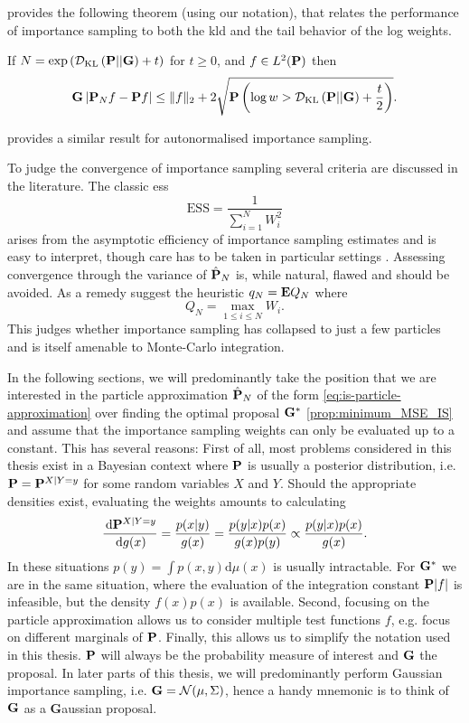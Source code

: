 \cite{Chatterjee2018Sample} provides the following theorem (using our notation), that relates the performance of importance sampling to both the \gls{kld} and the tail behavior of the log weights.
\begin{theorem}
    \label{thm:chatterje2018Thm1}
    If $N = \exp \left( \Dkl{\P}{\G} + t \right)$ for $ t\geq 0$, and $f \in L^{2}(\P)$ then
    $$
        \G \left\lvert \P_{N} f - \P f \right\rvert \leq \lVert f \rVert_{2} + 2 \sqrt{ \P \left( \log w > \Dkl{\P}{\G} + \frac{t}{2} \right)}.
    $$
\end{theorem}
\citep[Theorem 1.2]{Chatterjee2018Sample} provides a similar result for autonormalised importance sampling.

To judge the convergence of importance sampling several criteria are discussed in the literature. The classic \gls{ess}\cite{Kong1994Sequential} 
$$
\text{ESS} = \frac{1}{\sum_{i = 1}^N W^{2}_{i}}
$$
arises from the asymptotic efficiency of importance sampling estimates and is easy to interpret, though care has to be taken in particular settings . Assessing convergence through the variance of $\hat \P_{N}$ is, while natural, flawed \cite{Chatterjee2018Sample} and should be avoided. As a remedy \cite{Chatterjee2018Sample} suggest the heuristic $q_{N} = \E Q_{N}$ where
$$
Q_{N} = \max_{1\leq i\leq N} W_{i}.
$$
This judges whether importance sampling has collapsed to just a few particles and is itself amenable to Monte-Carlo integration.

In the following sections, we will predominantly take the position that we are interested in the particle approximation $\hat\P_{N}$ of the form \cref{eq:is-particle-approximation} over finding the optimal proposal $\G^{\ast}$ \cref{prop:minimum_MSE_IS} and assume that the importance sampling weights can only be evaluated up to a constant. 
This has several reasons: First of all, most problems considered in this thesis exist in a Bayesian context where $\P$ is usually a posterior distribution, i.e. $\P = \P^{X|Y=y}$ for some random variables $X$ and $Y$. Should the appropriate densities exist, evaluating the weights amounts to calculating 
$$
\rnd{\P^{X| Y= y}}{g(x)} = \frac{p(x|y)}{g(x)} = \frac{p(y|x)p(x)}{g(x)p(y)} \propto \frac{p(y|x)p(x)}{g(x)}.
$$
In these situations $p(y) = \int p(x,y)\mathrm d \mu(x)$ is usually intractable. For $\G^{\ast}$ we are in the same situation, where the evaluation of the integration constant $\P \lvert f \rvert$ is infeasible, but the density $f(x)p(x)$ is available.
Second, focusing on the particle approximation allows us to consider multiple test functions $f$, e.g. focus on different marginals of $\P$. 
Finally, this allows us to simplify the notation used in this thesis. $\P$ will always be the probability measure of interest and $\G$ the proposal. In later parts of this thesis, we will predominantly perform Gaussian importance sampling, i.e. $\G = \mathcal N(\mu, \Sigma)$, hence a handy mnemonic is to think of $\G$ as a \textbf{G}aussian proposal.

